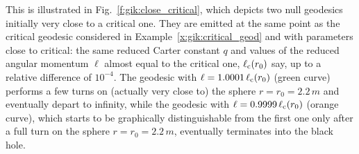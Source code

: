 This is illustrated in Fig.~\ref{f:gik:close_critical}, which depicts
two null geodesics initially very close to a critical one. They are emitted
at the same point as the critical geodesic considered in Example~\ref{x:gik:critical_geod}
and with parameters close to critical: the same reduced Carter constant $q$
and values of the reduced angular momentum $\ell$ almost equal to the critical
one, $\ell_{\rm c}(r_0)$ say, up to a relative difference of $10^{-4}$.
The geodesic with $\ell = 1.0001\,\ell_{\rm c}(r_0)$ (green curve) performs a few
turns on (actually very close to) the sphere $r=r_0 = 2.2\, m$ and eventually depart to infinity,
while the geodesic with $\ell = 0.9999\,\ell_{\rm c}(r_0)$ (orange curve), which starts
to be graphically distinguishable from the first one only after a full turn on the
sphere $r=r_0 = 2.2\, m$, eventually terminates into the black hole.



















